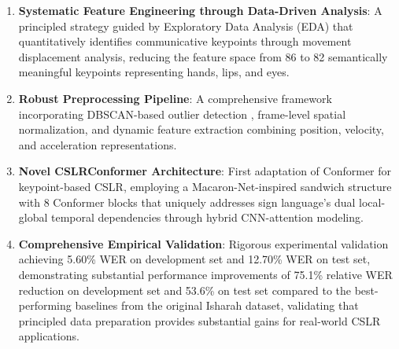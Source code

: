 \begin{enumerate}
   \item \textbf{Systematic Feature Engineering through Data-Driven Analysis}: A principled strategy guided by Exploratory Data Analysis (EDA) that quantitatively identifies communicative keypoints through movement displacement analysis, reducing the feature space from 86 to 82 semantically meaningful keypoints representing hands, lips, and eyes.
   
   \item \textbf{Robust Preprocessing Pipeline}: A comprehensive framework incorporating DBSCAN-based outlier detection \cite{deng2020dbscan}, frame-level spatial normalization, and dynamic feature extraction combining position, velocity, and acceleration representations.
   
   \item \textbf{Novel CSLRConformer Architecture}: First adaptation of Conformer for keypoint-based CSLR, employing a Macaron-Net-inspired sandwich structure with 8 Conformer blocks that uniquely addresses sign language's dual local-global temporal dependencies through hybrid CNN-attention modeling.
   
   \item \textbf{Comprehensive Empirical Validation}: Rigorous experimental validation achieving 5.60\% WER on development set and 12.70\% WER on test set, demonstrating substantial performance improvements of 75.1\% relative WER reduction on development set and 53.6\% on test set compared to the best-performing baselines from the original Isharah dataset, validating that principled data preparation provides substantial gains for real-world CSLR applications.
\end{enumerate}